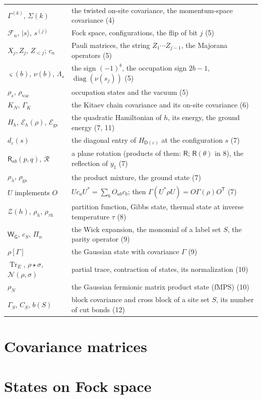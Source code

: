\documentclass[11pt]{article}
\numberwithin{equation}{section}
\newcommand{\revs}[1]{#1}
\theoremstyle{definition}
\theoremstyle{remark}
\theoremstyle{plain}
\newcommand{\T}{\mathsf T}
\newcommand{\D}{\mathsf D}
\newcommand{\Rot}{\mathsf R}
\newcommand{\G}{\mathsf G}
\newcommand{\W}{\mathsf W}
\newcommand{\ptr}[1]{\operatorname{Tr}_{#1}}
\begin{document}
\begin{center}
\begin{tabular}{@{}l>{\raggedright\arraybackslash}p{}@{}}
$\Gamma^{(k)}$, $\Sigma(k)$ & the twisted on-site covariance, the momentum-space covariance (4) \\
$\mathcal F_n$, $|s\rangle$, $s^{(j)}$ & Fock space, configurations, the flip of bit $j$ (5) \\
$X_j,Z_j$, $Z_{<j}$; $c_a$ & Pauli matrices, the string $Z_1\cdots Z_{j-1}$, the Majorana operators (5) \\
$\varsigma(b)$, $\nu(b)$, $\Lambda_s$ & the sign $(-1)^b$, the occupation sign $2b-1$, $\operatorname{diag}(\nu(s_j))$ (5) \\
$\rho_s$, $\rho_{\mathrm{vac}}$ & occupation states and the vacuum (5) \\
$K_N$, $\Gamma_K$ & the Kitaev chain covariance and its on-site covariance (6) \\
$H_h$, $\mathcal E_h(\rho)$, $\mathcal E_{\mathrm{gs}}$ & the quadratic Hamiltonian of $h$, its energy, the ground energy (7\revs{, 11}) \\
\revs{$d_\varepsilon(s)$} & \revs{the diagonal entry of $H_{\D(\varepsilon)}$ at the configuration $s$ (7)} \\
$\Rot_{ab}(p,q)$, $\mathcal R$ & a plane rotation (products of them: $\Rot$; $\Rot(\theta)$ in 8), the reflection of $y_1$ (7) \\
$\rho_\lambda$, $\rho_{\mathrm{gs}}$ & the product mixture, the ground state (7) \\
$U$ implements $O$ & $Uc_aU^*=\sum_bO_{ab}c_b$; then $\Gamma(U^*\rho U)=O\Gamma(\rho)O^{\T}$ (7) \\
$\mathcal Z(h)$, $\rho_h$, $\rho_{\tau h}$ & partition function, Gibbs state, thermal state at inverse temperature $\tau$ (8) \\
$\W_\G$, $c_S$, $\Pi_n$ & the Wick expansion, the monomial of a label set $S$, the parity operator (9) \\
$\rho[\Gamma]$ & the Gaussian state with covariance $\Gamma$ (9) \\
$\ptr{E}$, $\rho\star\sigma$, $\mathcal N(\rho,\sigma)$ & partial trace, contraction of states, its normalization (10) \\
$\rho_N$ & the Gaussian fermionic matrix product state (fMPS) (10) \\
$\Gamma_S$, $C_S$, $b(S)$ & block covariance and cross block of a site set $S$, its number of cut bonds (12)
\end{tabular}
\end{center}


\part{Covariance matrices}




\part{States on Fock space}











\end{document}
